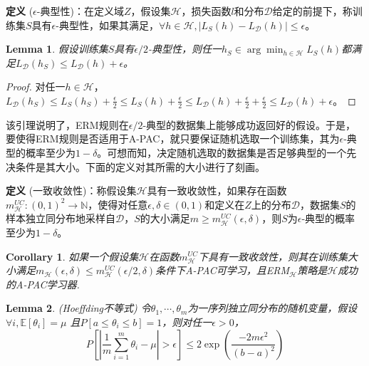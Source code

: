 \documentclass{article}
\newtheorem{corollary}{Corollary}
\newtheorem{lemma}{Lemma}
\newtheorem*{proof}{Proof}
\begin{document}
\noindent\textbf{定义} ($\epsilon$-典型性)：在定义域$Z$，假设集$\mathcal{H}$，损失函数$l$和分布$\mathcal{D}$给定的前提下，称训练集$S$具有$\epsilon$-典型性，如果其满足，$\forall h\in\mathcal{H},|L_S(h)-L_\mathcal{D}(h)|\leq\epsilon$。
	
	\begin{lemma}
	假设训练集$S$具有$\epsilon/2$-典型性，则任一$h_S\in\arg\min_{h\in\mathcal{H}}L_S(h)$都满足$L_\mathcal{D}(h_S) \leq L_\mathcal{D}(h)+\epsilon$。
	\end{lemma}
	
	\begin{proof}
	对任一$h\in\mathcal{H}$，$L_\mathcal{D}(h_S) \leq L_S(h_S)+\frac{\epsilon}{2} \leq L_S(h)+\frac{\epsilon}{2} \leq L_\mathcal{D}(h)+\frac{\epsilon}{2}+\frac{\epsilon}{2}\leq L_\mathcal{D}(h)+\epsilon$。
	\end{proof}
	
	该引理说明了，ERM规则在$\epsilon/2$-典型的数据集上能够成功返回好的假设。于是，要使得ERM规则是否适用于A-PAC，就只要保证随机选取一个训练集，其为$\epsilon$-典型的概率至少为$1-\delta$。可想而知，决定随机选取的数据集是否足够典型的一个先决条件是其大小。下面的定义对其所需的大小进行了刻画。
	
\noindent\textbf{定义} (一致收敛性)：称假设集$\mathcal{H}$具有一致收敛性，如果存在函数$m^{UC}_\mathcal{H}:(0,1)^2\rightarrow \mathbb{N}$，使得对任意$\epsilon,\delta \in (0, 1)$和定义在$Z$上的分布$\mathcal{D}$，数据集$S$的样本独立同分布地采样自$\mathcal{D}$，$S$的大小满足$m\geq m^{UC}_\mathcal{H}(\epsilon, \delta)$，则$S$为$\epsilon$-典型的概率至少为$1-\delta$。

	\begin{corollary}
	如果一个假设集$\mathcal{H}$在函数$m^{UC}_\mathcal{H}$下具有一致收敛性，则其在训练集大小满足$m_\mathcal{H}(\epsilon,\delta)\leq m^{UC}_\mathcal{H}(\epsilon/2,\delta)$条件下A-PAC可学习，且ERM$_\mathcal{H}$策略是$\mathcal{H}$成功的A-PAC学习器.
	\end{corollary}
	
	\begin{lemma}
	(Hoeffding不等式) 令$\theta_1,\cdots,\theta_m$为一序列独立同分布的随机变量，假设$\forall i, \mathbb{E}[\theta_i]=\mu$ 且$P[a\leq\theta_i\leq b]=1$，则对任一$\epsilon>0$，
	\begin{equation*}
	P\left[\left| \frac{1}{m}\sum_{i=1}^m\theta_i - \mu \right| >\epsilon \right] \leq 2 \exp \left( \frac{-2m\epsilon^2 }{(b-a)^2} \right)
	\end{equation*}
	\end{lemma}
\end{document}
